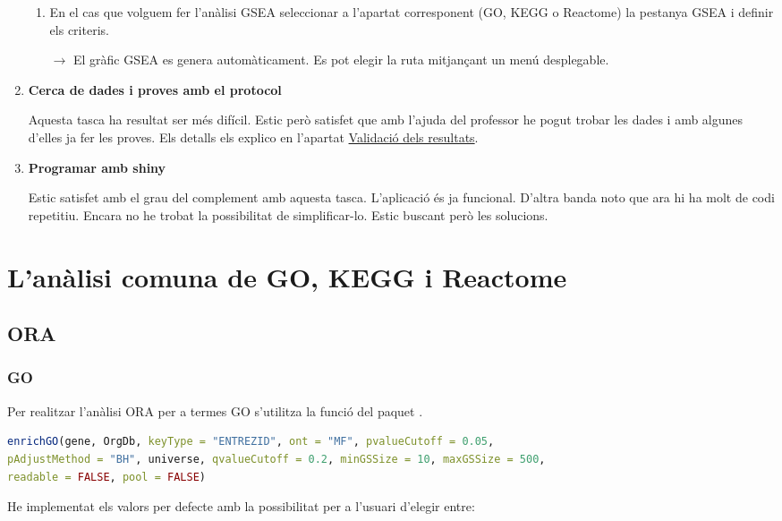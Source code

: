 \documentclass[]{article}
\begin{document}
\begin{enumerate}
\begin{enumerate}
\item En el cas que volguem fer l'anàlisi GSEA seleccionar a l'apartat corresponent (GO, KEGG o Reactome) la pestanya GSEA i definir els criteris.

$\rightarrow$ El gràfic GSEA es genera automàticament. Es pot elegir la ruta mitjançant un menú desplegable.

\end{enumerate}

\item \textbf{Cerca de dades i proves amb el protocol}

Aquesta tasca ha resultat ser més difícil. Estic però satisfet que amb l’ajuda del professor he pogut trobar les dades i amb algunes d'elles ja fer les proves. Els detalls els explico en l'apartat \hyperref[sec:ValRes]{Validació dels resultats}.

\item \textbf{Programar amb shiny}

Estic satisfet amb el grau del complement amb aquesta tasca. L'aplicació és ja funcional. D'altra banda noto que ara hi ha molt de codi repetitiu. Encara no he trobat la possibilitat de simplificar-lo. Estic buscant però les solucions.
\end{enumerate}

\section{L'anàlisi comuna de GO, KEGG i Reactome}
\label{sec:ACom}

\subsection{ORA}

\subsubsection{GO}

Per realitzar l'anàlisi ORA per a termes GO s'utilitza la funció  del paquet .
\begin{lstlisting}[language=R]
enrichGO(gene, OrgDb, keyType = "ENTREZID", ont = "MF", pvalueCutoff = 0.05, 
pAdjustMethod = "BH", universe, qvalueCutoff = 0.2, minGSSize = 10, maxGSSize = 500, 
readable = FALSE, pool = FALSE)
\end{lstlisting}

He implementat els valors per defecte amb la possibilitat per a l’usuari d'elegir entre:
\end{document}
